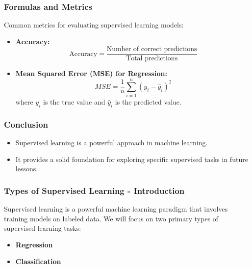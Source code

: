 \documentclass[aspectratio=169]{beamer}
\begin{document}
\begin{frame}[fragile]
    \frametitle{Formulas and Metrics}
    Common metrics for evaluating supervised learning models:
    
    \begin{itemize}
        \item \textbf{Accuracy:} 
        \begin{equation}
            \text{Accuracy} = \frac{\text{Number of correct predictions}}{\text{Total predictions}}
        \end{equation}
        
        \item \textbf{Mean Squared Error (MSE) for Regression:}
        \begin{equation}
            MSE = \frac{1}{n} \sum_{i=1}^{n} (y_i - \hat{y}_i)^2
        \end{equation}
        where \(y_i\) is the true value and \(\hat{y}_i\) is the predicted value.
    \end{itemize}
\end{frame}

\begin{frame}[fragile]
    \frametitle{Conclusion}
    \begin{itemize}
        \item Supervised learning is a powerful approach in machine learning.
        \item It provides a solid foundation for exploring specific supervised tasks in future lessons.
    \end{itemize}
\end{frame}

\begin{frame}[fragile]
    \frametitle{Types of Supervised Learning - Introduction}
    Supervised learning is a powerful machine learning paradigm that involves training models on labeled data.  
    We will focus on two primary types of supervised learning tasks: 
    \begin{itemize}
        \item \textbf{Regression}
        \item \textbf{Classification}
    \end{itemize}
\end{frame}
\end{document}
